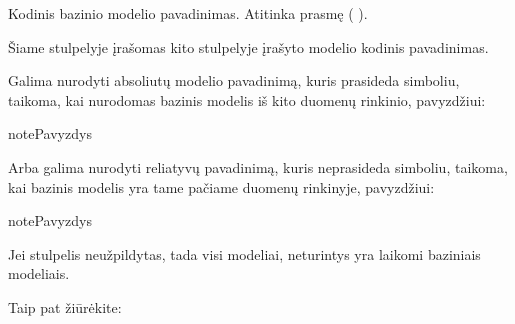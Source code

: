 \documentclass[letterpaper,10pt,lithuanian]{sphinxmanual}
\begin{document}
\begin{fulllineitems}
\label{\detokenize{formatas:base}}
\pysigstartsignatures
\pysigline
{}
\pysigstopsignatures
\sphinxAtStartPar
{}

\sphinxAtStartPar
Kodinis bazinio modelio pavadinimas. Atitinka  prasmę
({\hyperref[\detokenize{formatas:model}]{}}  {\hyperref[\detokenize{formatas:base}]{}}).

\sphinxAtStartPar
Šiame stulpelyje įrašomas kito {\hyperref[\detokenize{formatas:model}]{}} stulpelyje įrašyto modelio
kodinis pavadinimas.

\sphinxAtStartPar
Galima nurodyti absoliutų modelio pavadinimą, kuris prasideda \sphinxcode{\sphinxupquote{/}} simboliu,
taikoma, kai nurodomas bazinis modelis iš kito duomenų rinkinio,
pavyzdžiui:

\begin{sphinxadmonition}{note}{Pavyzdys}

\sphinxAtStartPar
{}
\end{sphinxadmonition}

\sphinxAtStartPar
Arba galima nurodyti reliatyvų pavadinimą, kuris neprasideda \sphinxcode{\sphinxupquote{/}} simboliu,
taikoma, kai bazinis modelis yra tame pačiame duomenų rinkinyje, pavyzdžiui:

\begin{sphinxadmonition}{note}{Pavyzdys}

\sphinxAtStartPar
{}
\end{sphinxadmonition}

\sphinxAtStartPar
Jei  stulpelis neužpildytas, tada visi modeliai, neturintys 
yra laikomi baziniais modeliais.


\begin{sphinxseealso}{Taip pat žiūrėkite:}

\begin{DUlineblock}{0em}
\item[] {\hyperref[\detokenize{dimensijos:base}]{}}
\item[] {\hyperref[\detokenize{apibendrinimas:generalization}]{}}
\end{DUlineblock}


\end{sphinxseealso}


\end{fulllineitems}
\end{document}
